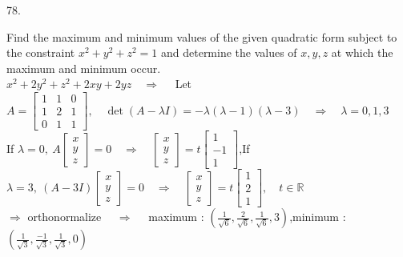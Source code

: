 \documentclass[12pt]{book}
\begin{document}
\begin{CJK}{UTF8}{bsmi}
78. \begin{minipage}[t]{\dimexpr\linewidth-2em}
Find the maximum and minimum values of the given quadratic form subject to the constraint $x^2+y^2+z^2=1$ and determine the values of $x, y, z$ at which the maximum and minimum occur. \\
$x^2+2y^2+z^2+2xy+2yz\quad\Rightarrow\quad$ Let $A=\begin{bmatrix}
1 & 1 & 0 \\
1 & 2 & 1 \\
0 & 1 & 1
\end{bmatrix},\quad\det(A-\lambda I)=-\lambda(\lambda-1)(\lambda-3)\quad\Rightarrow\quad\lambda=0, 1, 3$ \\
If $\lambda=0,\ A\begin{bmatrix}
x \\ y \\ z
\end{bmatrix}=0\quad\Rightarrow\quad\begin{bmatrix}
x \\ y \\ z
\end{bmatrix}=t\begin{bmatrix}
1 \\ -1 \\ 1
\end{bmatrix}$,\quad If $\lambda=3,\ (A-3I)\begin{bmatrix}
x \\ y \\ z
\end{bmatrix}=0\quad\Rightarrow\quad\begin{bmatrix}
x \\ y \\ z
\end{bmatrix}=t\begin{bmatrix}
1 \\ 2 \\ 1
\end{bmatrix},\quad t\in\mathbb{R}$ \\
$\Rightarrow$ orthonormalize $\quad\Rightarrow\quad$ maximum : $\displaystyle\left(\frac{1}{\sqrt{6}}, \frac{2}{\sqrt{6}}, \frac{1}{\sqrt{6}}, 3\right)$,\quad minimum : $\displaystyle\left(\frac{1}{\sqrt{3}}, \frac{-1}{\sqrt{3}}, \frac{1}{\sqrt{3}}, 0\right)$
\end{minipage}\\


\end{CJK}
\end{document}
